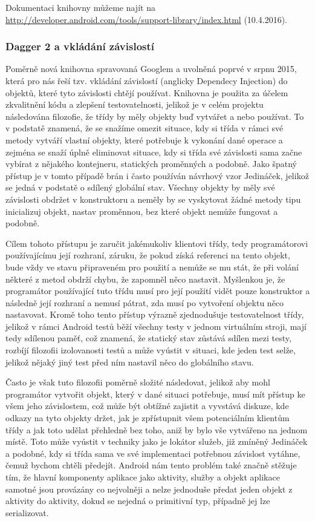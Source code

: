 \documentclass[czech,master,public,dept460,male,java,cpdeclaration]{diploma}
\begin{document}
Dokumentaci knihovny můžeme najít na \url{http://developer.android.com/tools/support-library/index.html}  (10.4.2016).

\subsubsection{Dagger 2 a vkládání závislostí}\label{dagger2}
Poměrně nová knihovna spravovaná Googlem a uvolněná poprvé v srpnu 2015, která pro nás řeší tzv. vkládání
závislostí (anglicky Dependecy Injection) do objektů,
které tyto závislosti chtějí používat. Knihovna je použita za účelem zkvalitnění kódu a zlepšení testovatelnosti, jelikož
je v celém projektu následována filozofie, že třídy by měly objekty buď vytvářet a nebo používat. To v podstatě znamená,
že se snažíme omezit situace, kdy si třída v rámci své metody vytváří vlastní objekty, které potřebuje k vykonání
dané operace a zejména se snaží úplně eliminovat situace, kdy si třída své závislosti sama začne vybírat z nějakého
kontejneru, statických proměnných a podobně. Jako špatný přístup je v tomto případě brán i často používán návrhový vzor
Jedináček, jelikož se jedná v podstatě o sdílený globální stav. Všechny objekty by měly své závislosti obdržet v konstruktoru
a neměly by se vyskytovat žádné metody tipu inicializuj objekt, nastav proměnnou, bez které objekt nemůže fungovat a podobně.

Cílem tohoto přístupu je zaručit jakémukoliv klientovi třídy, tedy programátorovi používajícímu její rozhraní,
záruku, že pokud získá referenci na tento objekt, bude vždy ve stavu připraveném pro použití a nemůže se mu stát,
že při volání některé z metod obdrží chybu, že zapomněl něco nastavit. Myšlenkou je, že programátor používající
tuto třídu musí pro její použití vidět pouze konstruktor a následně její rozhraní a nemusí pátrat, zda musí po
vytvoření objektu něco nastavovat. Kromě toho tento přístup výrazně zjednodušuje testovatelnost třídy, jelikož v rámci
Android testů běží všechny testy v jednom virtuálním stroji, mají tedy sdílenou paměť, což znamená, že statický
stav zůstává sdílen mezi testy, rozbíjí filozofii izolovanosti testů a může vyústit v situaci, kde jeden test selže,
jelikož nějaký jiný test před ním nastavil něco do globálního stavu.

Často je však tuto filozofii poměrně složité následovat, jelikož aby mohl programátor vytvořit objekt, který
v dané situaci potřebuje, musí mít přístup ke všem jeho závislostem, což může být obtížné zajistit
a vyvstává diskuze, kde odkazy na tyto objekty držet, jak je zpřístupnit všem potenciálním klientům třídy
a jak toto udělat přehledně bez toho, aniž by bylo vše vytvářeno na jednom místě. Toto může vyústit v techniky
jako je lokátor služeb, již zmíněný Jedináček a podobné, kdy si třída sama ve své implementaci potřebnou
závislost vytáhne, čemuž bychom chtěli předejít.
Android nám tento problém také značně stěžuje tím, že hlavní komponenty aplikace jako aktivity, služby a objekt
aplikace samotné jsou provázány co nejvolněji a nelze jednoduše předat jeden objekt z aktivity do aktivity,
dokud se nejedná o primitivní typ, případně jej lze serializovat.
\end{document}
